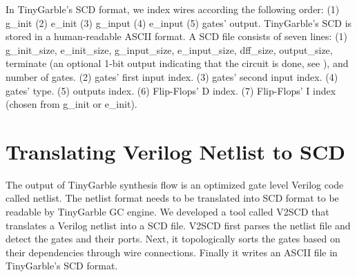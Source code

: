 In TinyGarble's SCD format, we index wires according the following order: (1) g\_init (2) e\_init (3) g\_input (4) e\_input (5) gates' output.
TinyGarble's SCD is stored in a human-readable ASCII format.
A SCD file consists of seven lines: (1) g\_init\_size, e\_init\_size, g\_input\_size, e\_input\_size, dff\_size, output\_size, terminate (an optional 1-bit output indicating that the circuit is done, see ), and number of gates. (2) gates' first input index. (3) gates' second input index. (4) gates' type. (5) outputs index. (6) Flip-Flops' D index. (7) Flip-Flops' I index (chosen from g\_init or e\_init).

\section{Translating Verilog Netlist to SCD}
The output of TinyGarble synthesis flow is an optimized gate level Verilog code called netlist.
The netlist format needs to be translated into SCD format to be readable by TinyGarble GC engine.
We developed a tool called V2SCD that translates a Verilog netlist into a SCD file.
V2SCD first parses the netlist file and detect the gates and their ports.
Next, it topologically sorts the gates based on their dependencies through wire connections.
Finally it writes an ASCII file in TinyGarble's SCD format.


